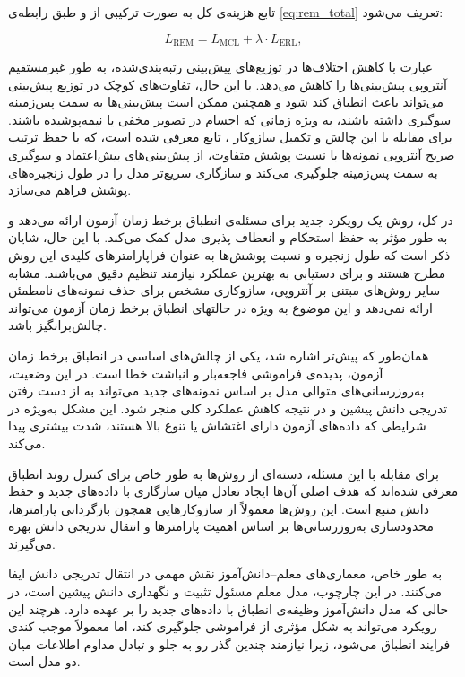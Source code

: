تابع هزینه‌ی کل به صورت ترکیبی از  و   طبق رابطه‌ی \ref{eq:rem_total} تعریف می‌شود\cite{rem}:  

\begin{equation}
	L_{\text{REM}} = L_{\text{MCL}} + \lambda \cdot L_{\text{ERL}},
	\label{eq:rem_total}
\end{equation}

عبارت  با کاهش اختلاف‌ها در توزیع‌های پیش‌بینی رتبه‌بندی‌شده، به طور غیرمستقیم آنتروپی پیش‌بینی‌ها را کاهش می‌دهد. با این حال، تفاوت‌های کوچک در توزیع پیش‌بینی می‌تواند باعث انطباق کند شود و همچنین ممکن است پیش‌بینی‌ها به سمت پس‌زمینه سوگیری داشته باشند، به ویژه زمانی که اجسام در تصویر مخفی یا نیمه‌پوشیده باشند. برای مقابله با این چالش و تکمیل سازوکار ، تابع  معرفی شده است، که با حفظ ترتیب صریح آنتروپی نمونه‌ها با نسبت پوشش متفاوت، از پیش‌بینی‌های بیش‌اعتماد و سوگیری به سمت پس‌زمینه جلوگیری می‌کند و سازگاری سریع‌تر مدل را در طول زنجیره‌های پوشش فراهم می‌سازد.  

در کل، روش  یک رویکرد جدید برای مسئله‌ی انطباق برخط زمان آزمون ارائه می‌دهد و به طور مؤثر به حفظ استحکام و انعطاف ‌پذیری مدل کمک می‌کند. با این حال، شایان ذکر است که طول زنجیره و نسبت پوشش‌ها به عنوان فراپارامترهای کلیدی این روش مطرح هستند و برای دستیابی به بهترین عملکرد نیازمند تنظیم دقیق می‌باشند. مشابه سایر روش‌های مبتنی بر آنتروپی،  سازوکاری مشخص برای حذف نمونه‌های نامطمئن ارائه نمی‌دهد و این موضوع به ویژه در حالتهای انطباق برخط زمان آزمون می‌تواند چالش‌برانگیز باشد.  


همان‌طور که پیش‌تر اشاره شد، یکی از چالش‌های اساسی در انطباق برخط زمان آزمون، پدیده‌ی فراموشی فاجعه‌بار و انباشت خطا است. در این وضعیت، به‌روزرسانی‌های متوالی مدل بر اساس نمونه‌های جدید می‌تواند به از دست رفتن تدریجی دانش پیشین و در نتیجه کاهش عملکرد کلی منجر شود. این مشکل به‌ویژه در شرایطی که داده‌های آزمون دارای اغتشاش یا تنوع بالا هستند، شدت بیشتری پیدا می‌کند.  

برای مقابله با این مسئله، دسته‌ای از روش‌ها به طور خاص برای کنترل روند انطباق معرفی شده‌اند که هدف اصلی آن‌ها ایجاد تعادل میان سازگاری با داده‌های جدید و حفظ دانش منبع است. این روش‌ها معمولاً از سازوکار‌هایی همچون بازگردانی پارامترها، محدودسازی به‌روزرسانی‌ها بر اساس اهمیت پارامترها و انتقال تدریجی دانش بهره می‌گیرند.  

به طور خاص، معماری‌های معلم–دانش‌آموز نقش مهمی در انتقال تدریجی دانش ایفا می‌کنند. در این چارچوب، مدل معلم مسئول تثبیت و نگهداری دانش پیشین است، در حالی که مدل دانش‌آموز وظیفه‌ی انطباق با داده‌های جدید را بر عهده دارد. هرچند این رویکرد می‌تواند به شکل مؤثری از فراموشی جلوگیری کند، اما معمولاً موجب کندی فرایند انطباق می‌شود، زیرا نیازمند چندین گذر رو به جلو و تبادل مداوم اطلاعات میان دو مدل است.  

